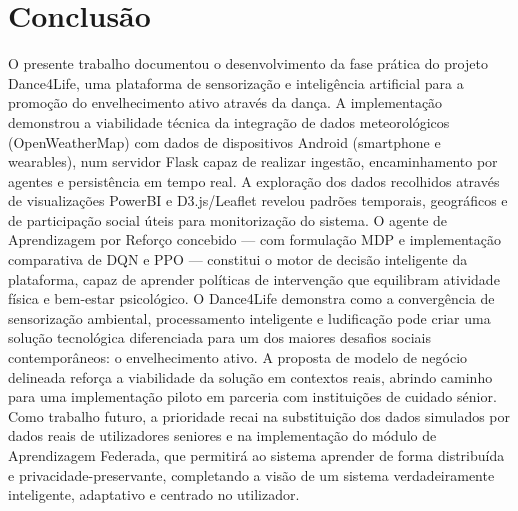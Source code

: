 \documentclass[runningheads]{llncs}
\begin{document}
\section{Conclusão}
O presente trabalho documentou o desenvolvimento da fase prática do projeto Dance4Life, uma plataforma de sensorização e inteligência artificial para a promoção do envelhecimento ativo através da dança. A implementação demonstrou a viabilidade técnica da integração de dados meteorológicos (OpenWeatherMap) com dados de dispositivos Android (smartphone e wearables), num servidor Flask capaz de realizar ingestão, encaminhamento por agentes e persistência em tempo real.
A exploração dos dados recolhidos através de visualizações PowerBI e D3.js/Leaflet revelou padrões temporais, geográficos e de participação social úteis para monitorização do sistema. O agente de Aprendizagem por Reforço concebido — com formulação MDP e implementação comparativa de DQN e PPO — constitui o motor de decisão inteligente da plataforma, capaz de aprender políticas de intervenção que equilibram atividade física e bem-estar psicológico.
O Dance4Life demonstra como a convergência de sensorização ambiental, processamento inteligente e ludificação pode criar uma solução tecnológica diferenciada para um dos maiores desafios sociais contemporâneos: o envelhecimento ativo. A proposta de modelo de negócio delineada reforça a viabilidade da solução em contextos reais, abrindo caminho para uma implementação piloto em parceria com instituições de cuidado sénior.
Como trabalho futuro, a prioridade recai na substituição dos dados simulados por dados reais de utilizadores seniores e na implementação do módulo de Aprendizagem Federada, que permitirá ao sistema aprender de forma distribuída e privacidade-preservante, completando a visão de um sistema verdadeiramente inteligente, adaptativo e centrado no utilizador.
\end{document}

